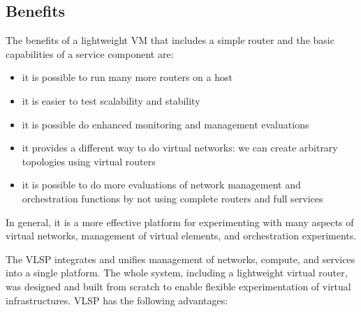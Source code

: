 \subsection{Benefits}

The benefits of a lightweight VM that includes a simple router and the
basic capabilities of a service component are: 

\begin{itemize}
\item it is possible to run many more routers on a host
\item it is easier to test scalability and stability
\item it is possible do enhanced monitoring and management evaluations
\item it provides a different way to do virtual networks: we can
  create arbitrary topologies using virtual routers 
\item it is possible to do more evaluations of network management and
orchestration functions by not
using complete routers and full services
\end{itemize}

\noindent In general, it is a more effective platform for
experimenting with many aspects of virtual networks, management of
virtual elements, and orchestration experiments.

The VLSP integrates and unifies management of networks,
compute, and services into a
single platform.
The whole system, including a lightweight virtual router, was
designed and built from scratch to enable flexible experimentation of
virtual infrastructures.  VLSP has the following
advantages:

